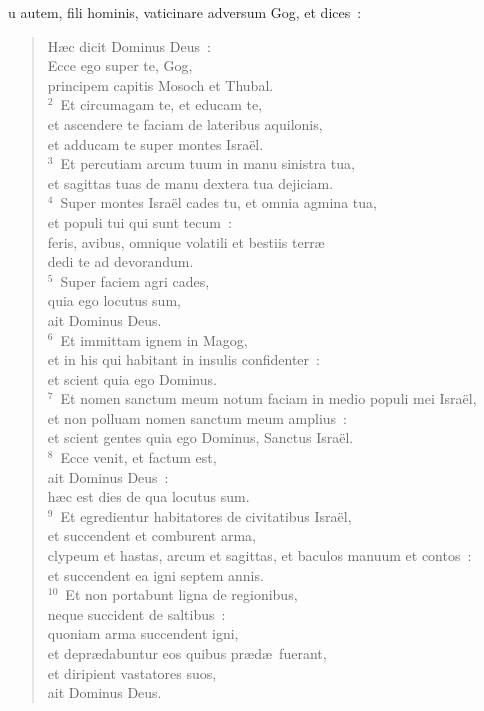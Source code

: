 \bchapter
{}u autem, fili hominis, vaticinare adversum Gog, et dices~: \begin{verse}\vspace{6pt}H\ae c dicit Dominus Deus~:\\ Ecce ego super te, Gog,\\ principem capitis Mosoch et Thubal.\\
${}^{2}$~Et circumagam te, et educam te,\\ et ascendere te faciam de lateribus aquilonis,\\ et adducam te super montes Isra\"el.\\
${}^{3}$~Et percutiam arcum tuum in manu sinistra tua,\\ et sagittas tuas de manu dextera tua dejiciam.\\
${}^{4}$~Super montes Isra\"el cades tu, et omnia agmina tua,\\ et populi tui qui sunt tecum~:\\ feris, avibus, omnique volatili et bestiis terr\ae \\ dedi te ad devorandum.\\
${}^{5}$~Super faciem agri cades,\\ quia ego locutus sum,\\ ait Dominus Deus.\\
${}^{6}$~Et immittam ignem in Magog,\\ et in his qui habitant in insulis confidenter~:\\ et scient quia ego Dominus.\\
${}^{7}$~Et nomen sanctum meum notum faciam in medio populi mei Isra\"el,\\ et non polluam nomen sanctum meum amplius~:\\ et scient gentes quia ego Dominus, Sanctus Isra\"el.\\
${}^{8}$~Ecce venit, et factum est,\\ ait Dominus Deus~:\\ h\ae c est dies de qua locutus sum.\\
${}^{9}$~Et egredientur habitatores de civitatibus Isra\"el,\\ et succendent et comburent arma,\\ clypeum et hastas, arcum et sagittas, et baculos manuum et contos~:\\ et succendent ea igni septem annis.\\
${}^{10}$~Et non portabunt ligna de regionibus,\\ neque succident de saltibus~:\\ quoniam arma succendent igni,\\ et depr\ae dabuntur eos quibus pr\ae d\ae\ fuerant,\\ et diripient vastatores suos,\\ ait Dominus Deus.\end{verse}


